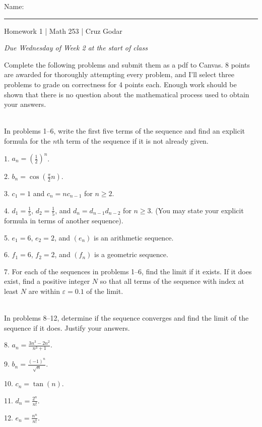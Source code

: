 \documentclass{article}
\begin{document}
\Large Name: \rule{2in}{0.15mm} \hfill Homework 1 | Math 253 | Cruz Godar \vspace{4pt}  \normalsize

\textit{Due Wednesday of Week 2 at the start of class}

Complete the following problems and submit them as a pdf to Canvas. 8 points are awarded for thoroughly attempting every problem, and I'll select three problems to grade on correctness for 4 points each. Enough work should be shown that there is no question about the mathematical process used to obtain your answers. 

~\\

In problems 1--6, write the first five terms of the sequence and find an explicit formula for the $n$th term of the sequence if it is not already given.

1. $\displaystyle a_n = \left( \frac{1}{2} \right)^n$.

2. $\displaystyle b_n = \cos\left( \frac{\pi}{2} n \right)$.

3. $\displaystyle c_1 = 1$ and $\displaystyle c_n = nc_{n - 1}$ for $n \geq 2$.

4. $\displaystyle d_1 = \frac{1}{5}$, $\displaystyle d_2 = \frac{1}{5}$, and $d_n = d_{n - 1}d_{n - 2}$ for $n \geq 3$. (You may state your explicit formula in terms of another sequence).

5. $e_1 = 6$, $e_2 = 2$, and $(e_n)$ is an arithmetic sequence.

6. $f_1 = 6$, $f_2 = 2$, and $(f_n)$ is a geometric sequence.

7. For each of the sequences in problems 1--6, find the limit if it exists. If it does exist, find a positive integer $N$ so that all terms of the sequence with index at least $N$ are within $\varepsilon = 0.1$ of the limit.

~\\

In problems 8--12, determine if the sequence converges and find the limit of the sequence if it does. Justify your answers.

8. $\displaystyle a_n = \frac{3n^3 - 2n^2}{n^3 + 1}$.

9. $\displaystyle b_n = \frac{(-1)^n}{\sqrt{n}}$.

10. $\displaystyle c_n = \tan(n)$.

11. $\displaystyle d_n = \frac{2^n}{n!}$.

12. $\displaystyle e_n = \frac{n^n}{n!}$.
\end{document}
